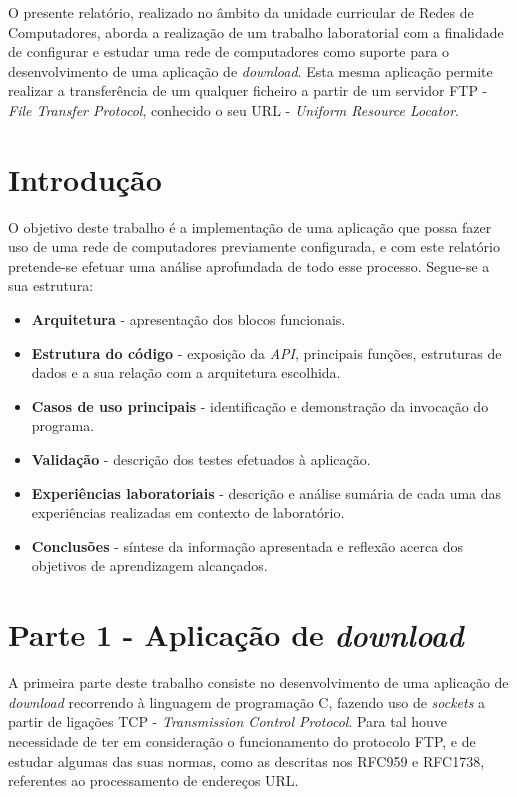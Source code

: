\documentclass[a4paper, 11pt]{article}
\begin{document}
O presente relatório, realizado no âmbito da unidade curricular de Redes de Computadores, aborda a realização de um trabalho laboratorial com a finalidade de configurar e estudar uma rede de computadores como suporte para o desenvolvimento de uma aplicação de \textit{download}. Esta mesma aplicação permite realizar a transferência de um qualquer ficheiro a partir de um servidor FTP - \textit{File Transfer Protocol}, conhecido o seu URL - \textit{Uniform Resource Locator}.

\section{Introdução}

O objetivo deste trabalho é a implementação de uma aplicação que possa fazer uso de uma rede de computadores previamente configurada, e com este relatório pretende-se efetuar uma análise aprofundada de todo esse processo. Segue-se a sua estrutura:
\begin{itemize}
	\item \textbf{Arquitetura} - apresentação dos blocos funcionais.
	\item \textbf{Estrutura do código} - exposição da \textit{API}, principais funções, estruturas de dados e a sua relação com a arquitetura escolhida.
	\item \textbf{Casos de uso principais} - identificação e demonstração da invocação do programa.
	\item \textbf{Validação} - descrição dos testes efetuados à aplicação.
	\item \textbf{Experiências laboratoriais} - descrição e análise sumária de cada uma das experiências realizadas em contexto de laboratório.
	\item \textbf{Conclusões} - síntese da informação apresentada e reflexão acerca dos objetivos de aprendizagem alcançados.
\end{itemize}

\section{Parte 1 - Aplicação de \textit{download}}

A primeira parte deste trabalho consiste no desenvolvimento de uma aplicação de \textit{download} recorrendo à linguagem de programação C, fazendo uso de \textit{sockets} a partir de ligações TCP - \textit{Transmission Control Protocol}. Para tal houve necessidade de ter em consideração o funcionamento do protocolo FTP, e de estudar algumas das suas normas, como as descritas nos RFC959 e RFC1738, referentes ao processamento de endereços URL.
\end{document}
